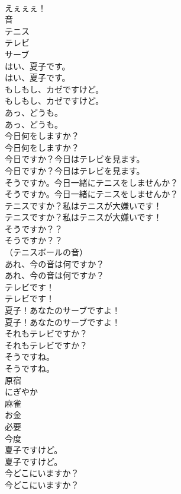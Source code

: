 \documentclass[8pt]{extreport}
\begin{document}
\begin{CJK}{UTF8}{min}
\\	えぇぇぇ！ 
\\	音
\\	テニス
\\	テレビ
\\	サーブ
\\	はい、夏子です。	
\\	はい、夏子です。 
\\	もしもし、カゼですけど。	
\\	もしもし、カゼですけど。 
\\	あっ、どうも。	
\\	あっ、どうも。 
\\	今日何をしますか？	
\\	今日何をしますか？ 
\\	今日ですか？今日はテレビを見ます。	
\\	今日ですか？今日はテレビを見ます。 
\\	そうですか。今日一緒にテニスをしませんか？	
\\	そうですか。今日一緒にテニスをしませんか？ 
\\	テニスですか？私はテニスが大嫌いです！	
\\	テニスですか？私はテニスが大嫌いです！ 
\\	そうですか？？	
\\	そうですか？？ 
\\	（テニスボールの音）	
\\	あれ、今の音は何ですか？	
\\	あれ、今の音は何ですか？ 
\\	テレビです！	
\\	テレビです！ 
\\	夏子！あなたのサーブですよ！	
\\	夏子！あなたのサーブですよ！ 
\\	それもテレビですか？	
\\	それもテレビですか？ 
\\	そうですね。	
\\	そうですね。 
\\	原宿
\\	にぎやか
\\	麻雀
\\	お金
\\	必要
\\	今度
\\	夏子ですけど。	
\\	夏子ですけど。 
\\	今どこにいますか？	
\\	今どこにいますか？ 

\end{CJK}
\end{document}

